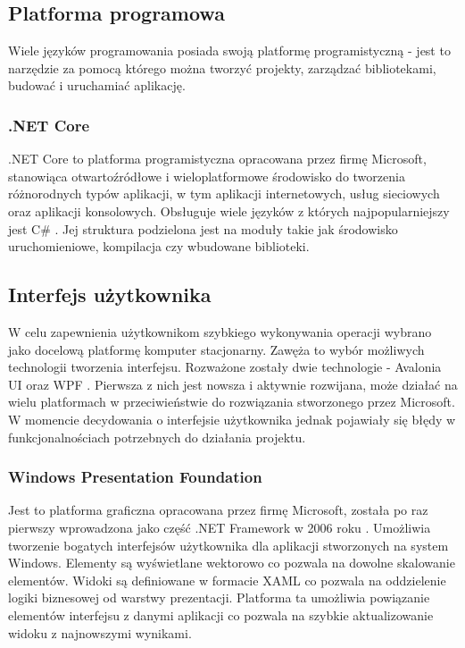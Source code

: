 \subsection{Platforma programowa}

Wiele języków programowania posiada swoją platformę programistyczną - jest to narzędzie za pomocą którego można tworzyć projekty, zarządzać bibliotekami, budować i uruchamiać aplikację.

\subsubsection{.NET Core}

.NET Core to platforma programistyczna opracowana przez firmę Microsoft, stanowiąca otwartoźródłowe i wieloplatformowe środowisko do tworzenia różnorodnych typów aplikacji, w tym aplikacji internetowych, usług sieciowych oraz aplikacji konsolowych.
Obsługuje wiele języków z których najpopularniejszy jest C\# \cite{dotnet}.
Jej struktura podzielona jest na moduły takie jak środowisko uruchomieniowe, kompilacja czy wbudowane biblioteki.

\subsection{Interfejs użytkownika}

W celu zapewnienia użytkownikom szybkiego wykonywania operacji wybrano jako docelową platformę komputer stacjonarny.
Zawęża to wybór możliwych technologii tworzenia interfejsu.
Rozważone zostały dwie technologie - Avalonia UI \cite{AvaloniaUI} oraz WPF \cite{wpf}.
Pierwsza z nich jest nowsza i aktywnie rozwijana, może działać na wielu platformach w przeciwieństwie do rozwiązania stworzonego przez Microsoft. 
W momencie decydowania o interfejsie użytkownika jednak pojawiały się błędy w funkcjonalnościach potrzebnych do działania projektu.

\subsubsection{Windows Presentation Foundation}

Jest to platforma graficzna opracowana przez firmę Microsoft, została po raz pierwszy wprowadzona jako część .NET Framework w 2006 roku \cite{wpfHistory}. 
Umożliwia tworzenie bogatych interfejsów użytkownika dla aplikacji stworzonych na system Windows.
Elementy są wyświetlane wektorowo co pozwala na dowolne skalowanie elementów. 
Widoki są definiowane w formacie XAML co pozwala na oddzielenie logiki biznesowej od warstwy prezentacji.
Platforma ta umożliwia powiązanie elementów interfejsu z danymi aplikacji co pozwala na szybkie aktualizowanie widoku z najnowszymi wynikami.

